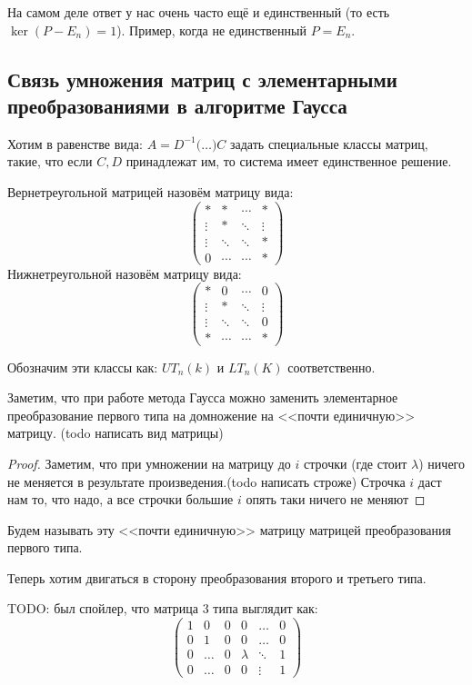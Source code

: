 \begin{example}
    На самом деле ответ у нас очень часто ещё и единственный
    (то есть $\ker(P-E_n)=1$). Пример, когда не единственный $P = E_n$.
\end{example}
\subsection{Связь умножения матриц с элементарными преобразованиями в алгоритме Гаусса}
\begin{motivation}
    Хотим в равенстве вида:
    $A = D^{-1}\big(\dots\big)C$
    задать специальные классы матриц, такие, что если
    $C,D$ принадлежат им, то система имеет единственное решение.
\end{motivation}
\begin{definition}
    Вернетреугольной матрицей назовём матрицу вида:$$\begin{pmatrix}
        * & * & \cdots & *\\
        \vdots & * & \ddots & \vdots\\
        \vdots & \ddots & \ddots & *\\
        0 & \cdots& \cdots& *
    \end{pmatrix}
    $$
    Нижнетреугольной назовём матрицу вида: $$\begin{pmatrix}
        * & 0 & \cdots & 0\\
        \vdots & * & \ddots & \vdots\\
        \vdots & \ddots & \ddots & 0\\
        * & \cdots& \cdots& *
    \end{pmatrix}
    $$

    Обозначим эти классы как: $UT_n(k)$ и $LT_n(K)$ соответственно.
\end{definition}
\begin{remark}
    Заметим, что при работе метода Гаусса
    можно заменить элементарное преобразование первого типа на 
    домножение на <<почти единичную>> матрицу. (todo написать вид матрицы)
\end{remark}
\begin{proof}
    Заметим, что при умножении на матрицу до $i$ строчки
    (где стоит $\lambda$) ничего не меняется в результате произведения.(todo написать строже)
    Строчка $i$ даст нам то, что надо, а все строчки большие $i$ опять таки
    ничего не меняют
\end{proof}
\begin{definition}
    Будем называть эту <<почти единичную>> матрицу матрицей
    преобразования первого типа.
\end{definition}
\begin{motivation}
    Теперь хотим двигаться в сторону преобразования второго и
    третьего типа.
\end{motivation}
TODO: был спойлер, что матрица 3 типа выглядит как:
$$
\begin{pmatrix}
    1 & 0 & 0 & 0 & \dots & 0\\
    0 & 1 & 0 & 0 & \dots & 0\\
    0 & \dots & 0 & \lambda & \ddots & 1\\
    0 & \dots & 0 & 0 & \vdots & 1
\end{pmatrix}
$$
